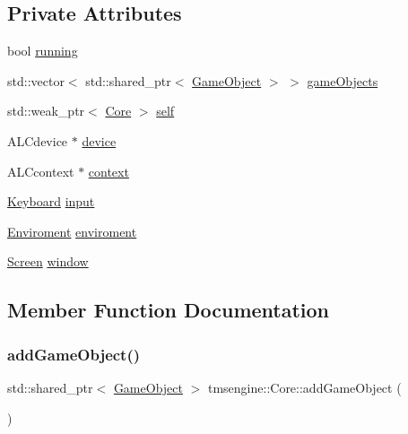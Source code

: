 \subsection*{Private Attributes}
\begin{DoxyCompactItemize}
\item 
bool \hyperlink{classtmsengine_1_1_core_a46a10c02877fce53aee7e4939f807ad8}{running}
\item 
std\+::vector$<$ std\+::shared\+\_\+ptr$<$ \hyperlink{classtmsengine_1_1_game_object}{Game\+Object} $>$ $>$ \hyperlink{classtmsengine_1_1_core_afcee2f870370b68981a6ccab00fd2408}{game\+Objects}
\item 
std\+::weak\+\_\+ptr$<$ \hyperlink{classtmsengine_1_1_core}{Core} $>$ \hyperlink{classtmsengine_1_1_core_a8a48e579f54f5ec8c9e795c544c72ecc}{self}
\item 
A\+L\+Cdevice $\ast$ \hyperlink{classtmsengine_1_1_core_a91929ead4dc4bbf21e54e06f1d80408b}{device}
\item 
A\+L\+Ccontext $\ast$ \hyperlink{classtmsengine_1_1_core_a7fc87c5ea5b9b682b8dddef5360e109f}{context}
\item 
\hyperlink{classtmsengine_1_1_keyboard}{Keyboard} \hyperlink{classtmsengine_1_1_core_a58114b7b85229158404c9d087e94e02a}{input}
\item 
\hyperlink{classtmsengine_1_1_enviroment}{Enviroment} \hyperlink{classtmsengine_1_1_core_a5d0429ccd5f0d3bbd18b997e52c0111d}{enviroment}
\item 
\hyperlink{classtmsengine_1_1_screen}{Screen} \hyperlink{classtmsengine_1_1_core_ac0aa6ed388a9fb1fda4c190fc0bb762b}{window}
\end{DoxyCompactItemize}


\subsection{Member Function Documentation}
\mbox{\label{classtmsengine_1_1_core_a6e341b3f9754d7b9ba9ad49bdf701eb6}} 
\subsubsection{\texorpdfstring{add\+Game\+Object()}{addGameObject()}}
{\footnotesize\ttfamily std\+::shared\+\_\+ptr$<$ \hyperlink{classtmsengine_1_1_game_object}{Game\+Object} $>$ tmsengine\+::\+Core\+::add\+Game\+Object (\begin{DoxyParamCaption}{ }\end{DoxyParamCaption})}

